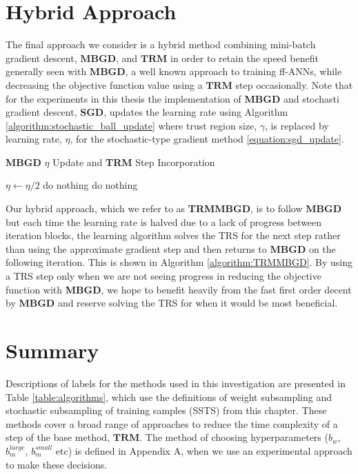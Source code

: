 \documentclass[letterpaper,12pt,titlepage,oneside,final]{book}
\begin{document}
	\section{Hybrid Approach}
	
	The final approach we consider is a hybrid method combining mini-batch gradient descent, $\textbf{MBGD}$, and $\textbf{TRM}$ in order to retain the speed benefit generally seen with $\mathbf{MBGD}$, a well known approach to training ff-ANNs, while decreasing the objective function value using a $\textbf{TRM}$ step occasionally. Note that for the experiments in this thesis the implementation of \textbf{MBGD} and stochasti gradient descent, \textbf{SGD}, updates the learning rate using Algorithm \ref{algorithm:stochastic_ball_update} where trust region size, $\gamma$, is replaced by learning rate, $\eta$, for the stochastic-type gradient method \ref{equation:sgd_update}. 
	
	\begin{algorithm}
		\caption{\textbf{MBGD} $\eta$ Update and \textbf{TRM} Step Incorporation}
		\begin{algorithmic}[1]
			\State $\eta \gets \eta / 2$
			\State [Take one \textbf{TRM} step with $\gamma = \eta$]
			\Else
			\State do nothing
			\EndIf
			\Else
			\State do nothing
			\EndIf
			\EndFunction
		\end{algorithmic}	
		\label{algorithm:TRMMBGD}	
	\end{algorithm}
	
	Our hybrid approach, which we refer to as \textbf{TRMMBGD}, is to follow $\mathbf{MBGD}$ but each time the learning rate is halved due to a lack of progress between iteration blocks, the learning algorithm solves the TRS for the next step rather than using the approximate gradient step and then returns to $\mathbf{MBGD}$ on the following iteration. This is shown in Algorithm \ref{algorithm:TRMMBGD}. By using a TRS step only when we are not seeing progress in reducing the objective function with \textbf{MBGD}, we hope to benefit heavily from the fast first order decent by $\mathbf{MBGD}$ and reserve solving the TRS for when it would be most beneficial.
	
	\section{Summary}
	
	Descriptions of labels for the methods used in this investigation are presented in Table \ref{table:algorithms}, which use the definitions of weight subsampling and stochastic subsampling of training samples (SSTS) from this chapter. These methods cover a broad range of approaches to reduce the time complexity of a step of the base method, $\mathbf{TRM}$. The method of choosing hyperparameters ($b_{w}$, $b_{m}^{large}$, $b_{m}^{small}$ etc) is defined in Appendix A, when we use an experimental approach to make these decisions.
	
\end{document}
